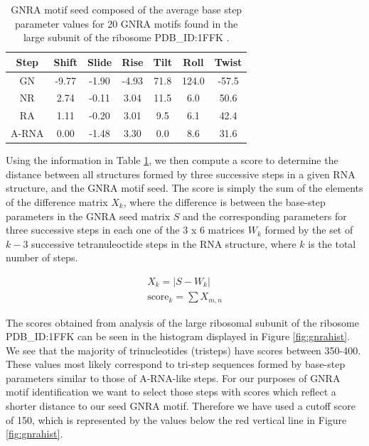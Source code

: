 \begin{table}[hb]  
\begin{center}
\begin{tabular}{|c|c|c|c|c|c|c|}
\hline
Step & Shift & Slide & Rise & Tilt & Roll & Twist \\
\hline
GN & -9.77 & -1.90 & -4.93 & 71.8 & 124.0 & -57.5 \\
NR & 2.74 & -0.11 & 3.04 & 11.5 & 6.0 & 50.6 \\
RA & 1.11 & -0.20 & 3.01 & 9.5 & 6.1 & 42.4 \\
A-RNA & 0.00 & -1.48 & 3.30 & 0.0 & 8.6 & 31.6\\
\hline
\end{tabular}
\caption{GNRA motif  seed composed of the average  base step parameter
  values for 20 GNRA motifs found in the large subunit of the ribosome
  PDB\_ID:1FFK \cite{lemieux2006}.}
\label{tab:seed}
\end{center}
\end{table}

Using the information in Table \ref{tab:seed}, we then compute a score
to  determine the  distance  between all  structures  formed by  three
successive  steps  in  a  given  RNA structure,  and  the  GNRA  motif
seed. The  score is simply the  sum of the elements  of the difference
matrix  $X_{k}$,  where  the   difference  is  between  the  base-step
parameters  in  the  GNRA   seed  matrix  $S$  and  the  corresponding
parameters  for three  successive  steps in  each  one of  the  3 x  6
matrices $W_{k}$ formed by the set of $k-3$ successive tetranuleoctide
steps in the RNA structure, where  $k$ is the total number of steps.

\begin{gather}
X_{k} = |S - W_{k}| \\
\text{score}_{k} = \sum X_{m,n} 
\end{gather}  

The scores  obtained from analysis  of the large ribosomal  subunit of
the ribosome  PDB\_ID:1FFK can be  seen in the histogram  displayed in
Figure \ref{fig:gnrahist}. We see  that the majority of trinucleotides
(tristeps)  have scores  between  350-400.  These  values most  likely
correspond  to  tri-step  sequences  formed  by  base-step  parameters
similar to those of A-RNA-like  steps.  For our purposes of GNRA motif
identification we want to select those steps with scores which reflect
a shorter distance  to our seed GNRA motif.  Therefore  we have used a
cutoff score of 150, which is  represented by the values below the red
vertical line in Figure \ref{fig:gnrahist}.


